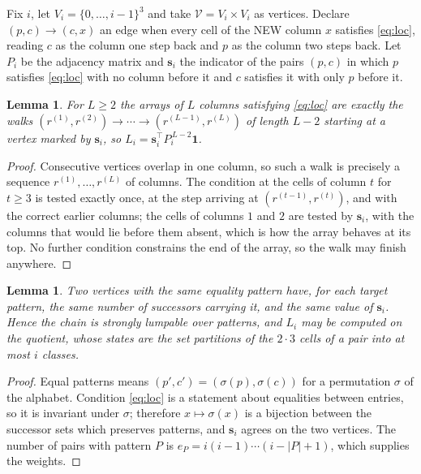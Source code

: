 \documentclass[11pt,a4paper]{article}
\theoremstyle{plain}
\newtheorem{lemma}[theorem]{Lemma}
\theoremstyle{definition}
\begin{document}
Fix $i$, let $V_i=\{0,\dots,i-1\}^{3}$ and take $\mathcal V=V_i\times V_i$ as vertices.
Declare $(p,c)\to(c,x)$ an edge when every cell of the NEW column $x$ satisfies
\eqref{eq:loc}, reading $c$ as the column one step back and $p$ as the column two steps
back. Let $P_i$ be the adjacency matrix and $\mathbf{s}_i$ the indicator of the pairs
$(p,c)$ in which $p$ satisfies \eqref{eq:loc} with no column before it and $c$ satisfies it
with only $p$ before it.

\begin{lemma}\label{lem:walk}
For $L\ge2$ the arrays of $L$ columns satisfying \eqref{eq:loc} are exactly the walks
$(r^{(1)},r^{(2)})\to\cdots\to(r^{(L-1)},r^{(L)})$ of length $L-2$ starting at a
vertex marked by $\mathbf{s}_i$, so
$L_i=\mathbf{s}_i^{\!\top}P_i^{\,L-2}\mathbf{1}$.
\end{lemma}

\begin{proof}
Consecutive vertices overlap in one column, so such a walk is precisely a sequence
$r^{(1)},\dots,r^{(L)}$ of columns. The condition at the cells of column $t$ for $t\ge3$
is tested exactly once, at the step arriving at $(r^{(t-1)},r^{(t)})$, and with the
correct earlier columns; the cells of columns $1$ and $2$ are tested by $\mathbf{s}_i$, with
the columns that would lie before them absent, which is how the array behaves at its top. No
further condition constrains the end of the array, so the walk may finish anywhere.
\end{proof}

\begin{lemma}\label{lem:lump}
Two vertices with the same equality pattern have, for each target pattern, the same number of
successors carrying it, and the same value of $\mathbf{s}_i$. Hence the chain is strongly
lumpable over patterns, and $L_i$ may be computed on the quotient, whose states are the set
partitions of the $2\cdot3$ cells of a pair into at most $i$ classes.
\end{lemma}

\begin{proof}
Equal patterns means $(p',c')=(\sigma(p),\sigma(c))$ for a permutation $\sigma$ of the
alphabet. Condition \eqref{eq:loc} is a statement about equalities between entries, so it is
invariant under $\sigma$; therefore $x\mapsto\sigma(x)$ is a bijection between the successor
sets which preserves patterns, and $\mathbf{s}_i$ agrees on the two vertices. The number of
pairs with pattern $P$ is $e_P=i(i-1)\cdots(i-|P|+1)$, which supplies the weights.
\end{proof}
\end{document}
